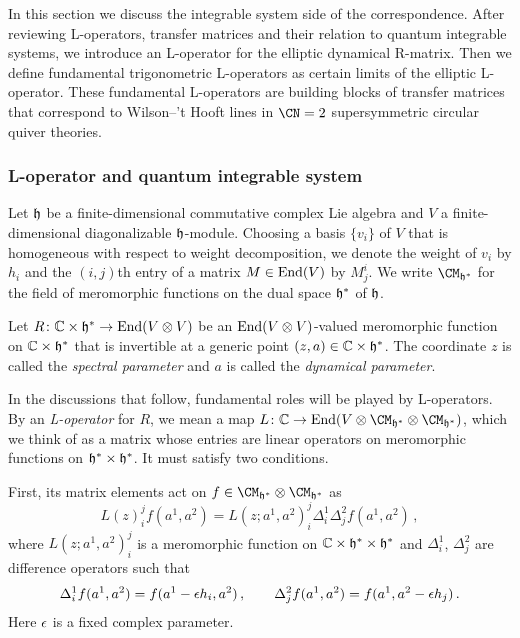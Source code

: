 In this section we discuss the integrable system side of the
correspondence.  After reviewing L-operators, transfer matrices and
their relation to quantum integrable systems, we introduce an
L-operator for the elliptic dynamical R-matrix.  Then we define
fundamental trigonometric L-operators as certain limits of the
elliptic L-operator.  These fundamental L-operators are building
blocks of transfer matrices that correspond to Wilson--'t Hooft lines
in $\CN = 2$ supersymmetric circular quiver theories.


\subsubsection{L-operator and quantum integrable system}

Let $\mathfrak{h}$ be a finite-dimensional commutative complex Lie algebra and
$V$ a finite-dimensional diagonalizable $\mathfrak{h}$-module.  Choosing a
basis $\{v_i\}$ of $V$ that is homogeneous with respect to weight
decomposition, we denote the weight of $v_i$ by $h_i$ and the
$(i,j)$th entry of a matrix $M \in \mathop{\mathrm{End}}\nolimits(V)$ by $M^i_j$.  We write
$\CM_{\hf^*}$ for the field of meromorphic functions on the dual
space $\mathfrak{h}^*$ of $\mathfrak{h}$.

Let $R\colon \mathbb{C} \times \mathfrak{h}^* \to \mathop{\mathrm{End}}\nolimits(V \otimes V)$ be an
$\mathop{\mathrm{End}}\nolimits(V \otimes V)$-valued meromorphic function on
$\mathbb{C} \times \mathfrak{h}^*$ that is invertible at a generic point
$(z,a) \in \mathbb{C} \times \mathfrak{h}^*$.  The coordinate $z$ is called
the \emph{spectral parameter} and $a$ is called the
\emph{dynamical parameter}.

In the discussions that follow, fundamental roles will be played by
L-operators.  By an \emph{L-operator} for $R$, we mean a map
$L\colon \C \to \End(V \otimes \CM_{\hf^*} \otimes
\CM_{\hf^*})$, which we think of as a matrix whose entries are
linear operators on meromorphic functions on
$\mathfrak{h}^* \times \mathfrak{h}^*$.  It must satisfy two conditions.

First, its matrix elements act on
$f \in \CM_{\hf^*} \otimes \CM_{\hf^*}$ as
\begin{equation}
  L(z)^j_i f(a^1,a^2)
  = L(z;a^1,a^2)^j_i \Delta_i^1 \Delta_j^2 f(a^1,a^2) \,,
\end{equation}
where $L(z;a^1,a^2)^j_i$ is a meromorphic function on
$\mathbb{C} \times \mathfrak{h}^* \times \mathfrak{h}^*$ and $\Delta_i^1$,
$\Delta_j^2$ are difference operators such that
\begin{equation}
  \Delta_i^1 f(a^1,a^2)
  = f(a^1 - \epsilon h_i,a^2) \,,
  \qquad
  \Delta_j^2 f(a^1,a^2)
  = f(a^1, a^2 - \epsilon h_j) \,.
\end{equation}
Here $\epsilon$ is a fixed complex parameter.

